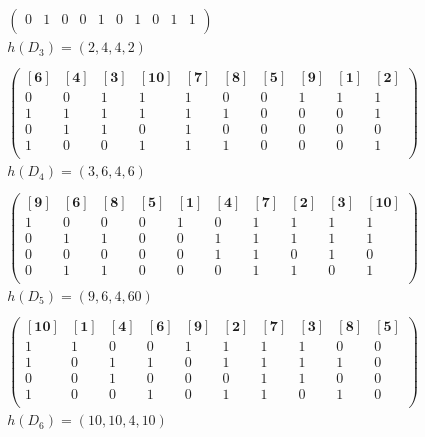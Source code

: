\documentclass[11pt]{scrartcl}
\begin{document}
\begin{equation*}
\begin{aligned}
\begin{pmatrix}
0   &   1   &   0   &   0   &   1   &   0   &   1   &   0   &   1   &    1\\
\end{pmatrix}\\
h(D_3)=(2,4,4,2)\\
\\
\begin{pmatrix}
\bm{[6]} & \bm{[4]} & \bm{[3]} & \bm{[10]} & \bm{[7]} & \bm{[8]} & \bm{[5]} & \bm{[9]} & \bm{[1]} & \bm{[2]}\\
0   &   0   &   1   &   1   &   1   &   0   &   0   &   1   &   1   &    1\\
1   &   1   &   1   &   1   &   1   &   1   &   0   &   0   &   0   &    1\\
0   &   1   &   1   &   0   &   1   &   0   &   0   &   0   &   0   &    0\\
1   &   0   &   0   &   1   &   1   &   1   &   0   &   0   &   0   &    1\\
\end{pmatrix}\\
h(D_4)=(3,6,4,6)\\
\\
\begin{pmatrix}
\bm{[9]} & \bm{[6]} & \bm{[8]} & \bm{[5]} & \bm{[1]} & \bm{[4]} & \bm{[7]} & \bm{[2]} & \bm{[3]} & \bm{[10]}\\
1   &   0   &   0   &   0   &   1   &   0   &   1   &   1   &   1   &    1\\
0   &   1   &   1   &   0   &   0   &   1   &   1   &   1   &   1   &    1\\
0   &   0   &   0   &   0   &   0   &   1   &   1   &   0   &   1   &    0\\
0   &   1   &   1   &   0   &   0   &   0   &   1   &   1   &   0   &    1\\
\end{pmatrix}\\
h(D_5)=(9,6,4,60)\\
\\
\begin{pmatrix}
\bm{[10]} & \bm{[1]} & \bm{[4]} & \bm{[6]} & \bm{[9]} & \bm{[2]} & \bm{[7]} & \bm{[3]} & \bm{[8]} & \bm{[5]}\\
1   &   1   &   0   &   0   &   1   &   1   &   1   &   1   &   0   &    0\\
1   &   0   &   1   &   1   &   0   &   1   &   1   &   1   &   1   &    0\\
0   &   0   &   1   &   0   &   0   &   0   &   1   &   1   &   0   &    0\\
1   &   0   &   0   &   1   &   0   &   1   &   1   &   0   &   1   &    0\\
\end{pmatrix}\\
h(D_6)=(10,10,4,10)\\
\\
\end{aligned}
\end{equation*}
\end{document}
